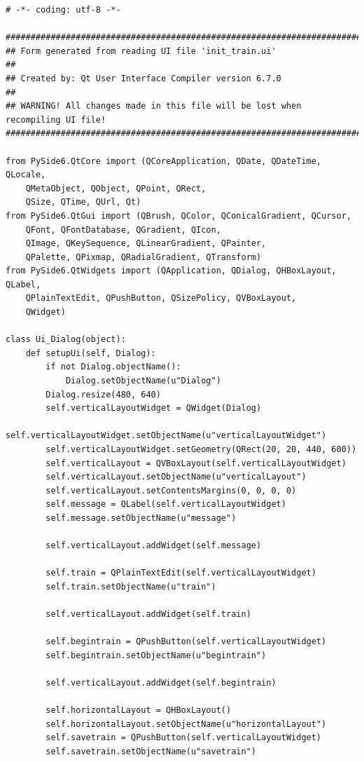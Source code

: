 \documentclass[a4paper,14pt]{extarticle}
\begin{document}
\begin{verbatim}
# -*- coding: utf-8 -*-

################################################################################
## Form generated from reading UI file 'init_train.ui'
##
## Created by: Qt User Interface Compiler version 6.7.0
##
## WARNING! All changes made in this file will be lost when recompiling UI file!
################################################################################

from PySide6.QtCore import (QCoreApplication, QDate, QDateTime, QLocale,
    QMetaObject, QObject, QPoint, QRect,
    QSize, QTime, QUrl, Qt)
from PySide6.QtGui import (QBrush, QColor, QConicalGradient, QCursor,
    QFont, QFontDatabase, QGradient, QIcon,
    QImage, QKeySequence, QLinearGradient, QPainter,
    QPalette, QPixmap, QRadialGradient, QTransform)
from PySide6.QtWidgets import (QApplication, QDialog, QHBoxLayout, QLabel,
    QPlainTextEdit, QPushButton, QSizePolicy, QVBoxLayout,
    QWidget)

class Ui_Dialog(object):
    def setupUi(self, Dialog):
        if not Dialog.objectName():
            Dialog.setObjectName(u"Dialog")
        Dialog.resize(480, 640)
        self.verticalLayoutWidget = QWidget(Dialog)
        self.verticalLayoutWidget.setObjectName(u"verticalLayoutWidget")
        self.verticalLayoutWidget.setGeometry(QRect(20, 20, 440, 600))
        self.verticalLayout = QVBoxLayout(self.verticalLayoutWidget)
        self.verticalLayout.setObjectName(u"verticalLayout")
        self.verticalLayout.setContentsMargins(0, 0, 0, 0)
        self.message = QLabel(self.verticalLayoutWidget)
        self.message.setObjectName(u"message")

        self.verticalLayout.addWidget(self.message)

        self.train = QPlainTextEdit(self.verticalLayoutWidget)
        self.train.setObjectName(u"train")

        self.verticalLayout.addWidget(self.train)

        self.begintrain = QPushButton(self.verticalLayoutWidget)
        self.begintrain.setObjectName(u"begintrain")

        self.verticalLayout.addWidget(self.begintrain)

        self.horizontalLayout = QHBoxLayout()
        self.horizontalLayout.setObjectName(u"horizontalLayout")
        self.savetrain = QPushButton(self.verticalLayoutWidget)
        self.savetrain.setObjectName(u"savetrain")


\end{verbatim}
\end{document}
